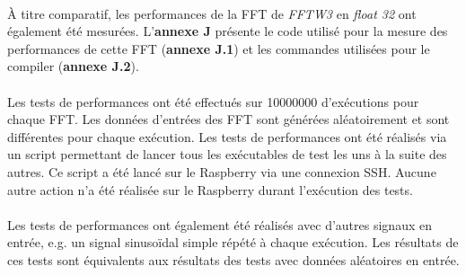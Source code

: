 \documentclass{article}
\begin{document}
    \paragraph{}
    À titre comparatif, les performances de la FFT de \emph{FFTW3} en \emph{float 32} ont également été mesurées. L'\textbf{annexe J} présente le code utilisé pour la mesure des performances de cette FFT (\textbf{annexe J.1}) et les commandes utilisées pour le compiler (\textbf{annexe J.2}).

    \paragraph{}
    Les tests de performances ont été effectués sur \SI{10000000}{} d'exécutions pour chaque FFT. Les données d'entrées des FFT sont générées aléatoirement et sont différentes pour chaque exécution. Les tests de performances ont été réalisés via un script permettant de lancer tous les exécutables de test les uns à la suite des autres. Ce script a été lancé sur le Raspberry via une connexion SSH. Aucune autre action n'a été réalisée sur le Raspberry durant l'exécution des tests.

    \paragraph{}
    Les tests de performances ont également été réalisés avec d'autres signaux en entrée, e.g. un signal sinusoïdal simple répété à chaque exécution. Les résultats de ces tests sont équivalents aux résultats des tests avec données aléatoires en entrée.
    
\end{document}

